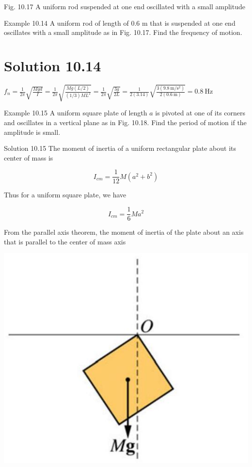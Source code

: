 \documentclass[10pt]{article}
\begin{document}
Fig. 10.17 A uniform rod suspended at one end oscillated with a small amplitude

Example 10.14 A uniform rod of length of 0.6 m that is suspended at one end oscillates with a small amplitude as in Fig. 10.17. Find the frequency of motion.

\section*{Solution 10.14}
$f_{n}=\frac{1}{2 \pi} \sqrt{\frac{M g d}{I}}=\frac{1}{2 \pi} \sqrt{\frac{M g(L / 2)}{(1 / 3) M L^{2}}}=\frac{1}{2 \pi} \sqrt{\frac{3 g}{2 L}}=\frac{1}{2(3.14)} \sqrt{\frac{3\left(9.8 \mathrm{~m} / \mathrm{s}^{2}\right)}{2(0.6 \mathrm{~m})}}=0.8 \mathrm{~Hz}$

Example 10.15 A uniform square plate of length $a$ is pivoted at one of its corners and oscillates in a vertical plane as in Fig. 10.18. Find the period of motion if the amplitude is small.

Solution 10.15 The moment of inertia of a uniform rectangular plate about its center of mass is

$$
I_{c m}=\frac{1}{12} M\left(a^{2}+b^{2}\right)
$$

Thus for a uniform square plate, we have

$$
I_{c m}=\frac{1}{6} M a^{2}
$$

From the parallel axis theorem, the moment of inertia of the plate about an axis that is parallel to the center of mass axis

\begin{center}
\includegraphics[max width=\textwidth]{2024_09_13_db1f357d2aad0a03eb2eg-172(1)}
\end{center}
\end{document}
